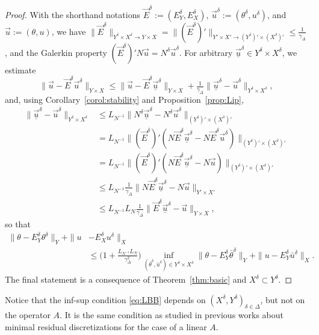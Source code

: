 \documentclass{amsart}
\numberwithin{equation}{section}
\newcommand{\1}{\mathbb 1}
\begin{document}
\begin{proof}
With the shorthand notations $\vec{E}^\delta:=(E_Y^\delta,E_X^\delta)$, $\vec{u}^\delta:=(\theta^\delta,u^\delta)$, and $\vec{u}:=(\theta,u)$, we have
$\|\vec{E}^\delta\|_{Y^\delta \times X^\delta \rightarrow Y \times X}=
\|(\vec{E}^\delta)'\|_{Y' \times X' \rightarrow (Y^\delta)' \times (X^\delta)' } \leq \frac{1}{\gamma_\Delta}$, and
 the Galerkin property $(\vec{E}^\delta)' N \vec{u}=N^\delta \vec{u}^\delta$. For arbitrary $\vec{\underline{u}}^\delta \in Y^\delta \times X^\delta$,
we estimate
$$
\|\vec{u}-\vec{E}^\delta \vec{u}^\delta\|_{Y \times X} \leq \|\vec{u}-\vec{E}^\delta \vec{\underline{u}}^\delta\|_{Y \times X}+  \tfrac{1}{\gamma_\Delta} \|\vec{\underline{u}}^\delta-\vec{u}^\delta\|_{Y^\delta \times X^\delta},
$$
and, using Corollary~\ref{corol:stability} and Proposition~\ref{prop:Lip},
\begin{align*}
\|\vec{\underline{u}}^\delta-\vec{u}^\delta\|_{Y^\delta \times X^\delta} &\leq L_{N^{-1}}\|N^\delta \vec{\underline{u}}^\delta -N^\delta \vec{u}^\delta\|_{(Y^\delta)' \times (X^\delta)'}\\
&= L_{N^{-1}}\|(\vec{E}^\delta)' (N \vec{E}^\delta \vec{\underline{u}}^\delta -N \vec{E}^\delta\vec{u}^\delta)\|_{(Y^\delta)' \times (X^\delta)'} \\
&= L_{N^{-1}}\|(\vec{E}^\delta)' (N \vec{E}^\delta \vec{\underline{u}}^\delta -N \vec{u})\|_{(Y^\delta)' \times (X^\delta)'}\\
& \leq L_{N^{-1}} \tfrac{1}{\gamma_\Delta}\| N \vec{E}^\delta \vec{\underline{u}}^\delta -N \vec{u}\|_{Y' \times X'}\\
& \leq L_{N^{-1}} L_N  \tfrac{1}{\gamma_\Delta}\|\vec{E}^\delta \vec{\underline{u}}^\delta - \vec{u}\|_{Y\times X},
\end{align*}
so that
\begin{align*}
\|\theta-E_Y^\delta \theta^\delta\|_Y+\|u&-E_X^\delta u^\delta\|_X 
\\ &\leq \big(1+\tfrac{L_{N^{-1}} L_N}{\gamma_\Delta^2}\big)
\inf_{(\bar{\theta}^\delta,\bar{u}^\delta) \in Y^\delta \times X^\delta} 
\|\theta-E_Y^\delta \bar{\theta}^\delta\|_Y+\|u-E_Y^\delta \bar{u}^\delta\|_X.
\end{align*}
The final statement is a consequence of Theorem~\ref{thm:basic} and $X^\delta \subset Y^\delta$.
\end{proof}

Notice that the inf-sup condition \eqref{eq:LBB} depends on $(X^\delta,Y^\delta)_{\delta \in \Delta}$, but not on the operator $A$.
It is the same condition as studied in previous works about minimal residual discretizations for the case of a linear $A$.
\end{document}
